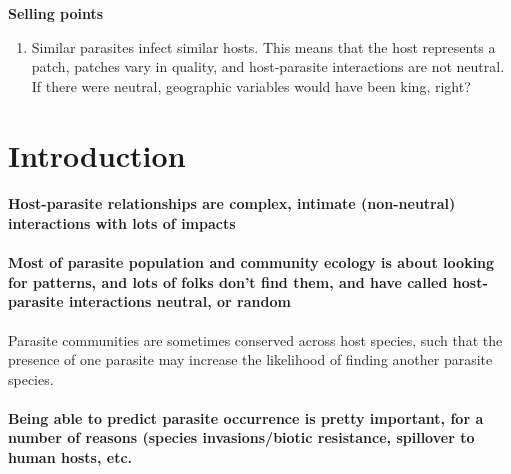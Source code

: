 \documentclass[12pt]{article}
\begin{document}
\textbf{Selling points} \\
\begin{enumerate}
 \item Similar parasites infect similar hosts. This means that the host represents a patch, patches vary in quality, and host-parasite interactions are not neutral. If there were neutral, geographic variables would have been king, right?
 
 
\end{enumerate}



\section{Introduction}
 \paragraph{Host-parasite relationships are complex, intimate (non-neutral) interactions with lots of impacts}
 
 
 \paragraph{Most of parasite population and community ecology is about looking for patterns, and lots of folks don't find them, and have called host-parasite interactions neutral, or random}
 Parasite communities are sometimes conserved across host species, such that the presence of one parasite may increase the likelihood of finding another parasite species.
 
 
 
 
 \paragraph{Being able to predict parasite occurrence is pretty important, for a number of reasons (species invasions/biotic resistance, spillover to human hosts, etc.}
 
 
 
 
 
\end{document}
